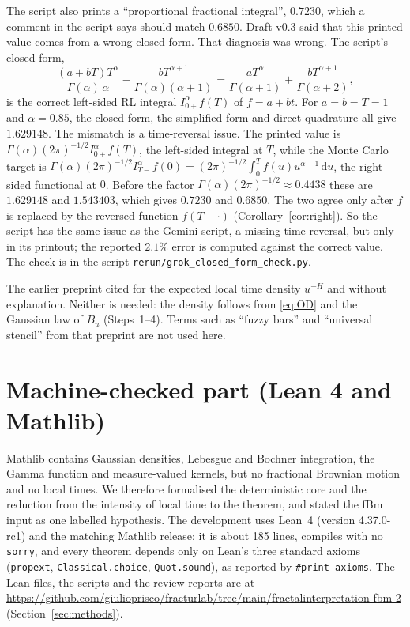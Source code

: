 \documentclass[11pt]{article}
\theoremstyle{remark}
\theoremstyle{definition}
\newcommand{\dd}{\,\mathrm{d}}
\newcommand{\Ia}{I^{\alpha}_{0+}}
\begin{document}
The script also prints a ``proportional fractional integral'', $0.7230$, which a comment in the script says should match $0.6850$. Draft v0.3 said that this printed value comes from a wrong closed form. That diagnosis was wrong. The script's closed form,
\[
\frac{(a+bT)T^\alpha}{\Gamma(\alpha)\,\alpha}-\frac{bT^{\alpha+1}}{\Gamma(\alpha)(\alpha+1)}=\frac{aT^\alpha}{\Gamma(\alpha+1)}+\frac{bT^{\alpha+1}}{\Gamma(\alpha+2)},
\]
is the correct left-sided RL integral $\Ia f(T)$ of $f=a+bt$. For $a=b=T=1$ and $\alpha=0.85$, the closed form, the simplified form and direct quadrature all give $1.629148$. The mismatch is a time-reversal issue. The printed value is $\Gamma(\alpha)(2\pi)^{-1/2}\Ia f(T)$, the left-sided integral at $T$, while the Monte Carlo target is $\Gamma(\alpha)(2\pi)^{-1/2}I^\alpha_{T-}f(0)=(2\pi)^{-1/2}\int_0^T f(u)u^{\alpha-1}\dd u$, the right-sided functional at $0$. Before the factor $\Gamma(\alpha)(2\pi)^{-1/2}\approx0.4438$ these are $1.629148$ and $1.543403$, which gives $0.7230$ and $0.6850$. The two agree only after $f$ is replaced by the reversed function $f(T-\cdot)$ (Corollary~\ref{cor:right}). So the script has the same issue as the Gemini script, a missing time reversal, but only in its printout; the reported $2.1\%$ error is computed against the correct value. The check is in the script \texttt{rerun/grok\_closed\_form\_check.py}.

The earlier preprint cited \cite{HO03} for the expected local time density $u^{-H}$ and \cite{CLRS11} without explanation. Neither is needed: the density follows from \eqref{eq:OD} and the Gaussian law of $B_u$ (Steps~1--4). Terms such as ``fuzzy bars'' and ``universal stencil'' from that preprint are not used here.

\section{Machine-checked part (Lean 4 and Mathlib)}\label{sec:lean}
Mathlib \cite{mathlib} contains Gaussian densities, Lebesgue and Bochner integration, the Gamma function and measure-valued kernels, but no fractional Brownian motion and no local times. We therefore formalised the deterministic core and the reduction from the intensity of local time to the theorem, and stated the fBm input as one labelled hypothesis. The development uses Lean~4 \cite{lean4} (version 4.37.0-rc1) and the matching Mathlib release; it is about 185 lines, compiles with no \texttt{sorry}, and every theorem depends only on Lean's three standard axioms (\texttt{propext}, \texttt{Classical.choice}, \texttt{Quot.sound}), as reported by \texttt{\#print axioms}. The Lean files, the scripts and the review reports are at \url{https://github.com/giulioprisco/fracturlab/tree/main/fractalinterpretation-fbm-2} (Section~\ref{sec:methods}).
\end{document}
